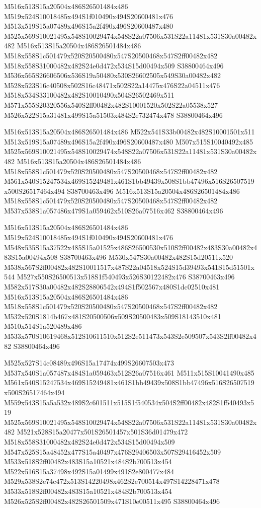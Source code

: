 \documentclass{article}
\begin{document}
\begin{multicols}{2}
M516x513S15a20504x486S26501484x486 M519x524S10018485x494S1f010490x494S20600481x476 M513x519S15a07489x496S15a2f490x496S20600487x480 M525x569S10021495x548S10029474x548S22a07506x531S22a11481x531S30a00482x482 M516x513S15a20504x486S26501484x486 M518x558S1c501479x520S20500480x547S20500468x547S2ff00482x482 M518x558S31000482x482S24e0d472x534S15d00494x509 S38800464x496 M536x565S26606506x536S19a50480x530S26602505x549S30a00482x482 M528x523S16c40508x502S16c48471x502S22a14475x476S22a04511x476 M518x534S33100482x482S10010490x504S26502469x511 M571x555S20320556x540S2ff00482x482S10001520x502S22a05538x527 M526x522S15a31481x499S15a51503x484S2e732474x478 S38800464x496

M516x513S15a20504x486S26501484x486 M522x541S33b00482x482S10001501x511 M513x519S15a07489x496S15a2f490x496S20600487x480 M507x515S10040492x485 M525x569S10021495x548S10029474x548S22a07506x531S22a11481x531S30a00482x482 M516x513S15a20504x486S26501484x486 M518x558S1c501479x520S20500480x547S20500468x547S2ff00482x482 M561x540S15247534x469S15249481x461S1bb49439x508S1bb47496x516S26507519x500S26517464x494 S38700463x496 M516x513S15a20504x486S26501484x486 M518x558S1c501479x520S20500480x547S20500468x547S2ff00482x482 M537x538S1a057486x479S1a059462x510S26a07516x462 S38800464x496

M516x513S15a20504x486S26501484x486 M519x524S10018485x494S1f010490x494S20600481x476 M548x535S15a37522x485S15a01525x486S26500530x510S2ff00482x483S30a00482x483S15a00494x508 S38700463x496 M530x547S30a00482x482S15d20511x520 M538x567S2ff00482x482S10011517x487S22a04518x524S15d39493x541S15d51501x544 M527x550S26500513x518S1f540493x526S30122482x476 S38700463x496 M582x517S30a00482x482S28806542x494S1f502567x480S1dc02510x481 M516x513S15a20504x486S26501484x486 M518x558S1c501479x520S20500480x547S20500468x547S2ff00482x482 M532x520S1814b467x481S20500506x509S20500483x509S18143510x481 M510x514S1a520489x486 M533x570S10619468x512S10611510x512S2e511473x543S2e509507x543S2ff00482x482 S38800464x496

M525x527S14c08489x496S15a17474x499S26607503x473 M537x540S1a057487x484S1a059463x512S26a07516x461 M511x515S10041490x485 M561x540S15247534x469S15249481x461S1bb49439x508S1bb47496x516S26507519x500S26517464x494 M559x543S15a5a532x489S2c601511x515S1f540534x504S2ff00482x482S1f540493x519 M525x569S10021495x548S10029474x548S22a07506x531S22a11481x531S30a00482x482 M521x528S15a20477x501S26501457x501S36d01479x472 M518x558S31000482x482S24e0d472x534S15d00494x509 M547x525S15a48452x477S15a40497x476S29406503x507S29416452x509 M533x518S2ff00482x483S15a10521x484S2b700513x454 M522x516S15a37498x492S15a01499x491S2e800477x484 M529x538S2e74c472x513S14220498x462S2e700514x497S14228471x478 M533x518S2ff00482x483S15a10521x484S2b700513x454 M526x525S2ff00482x482S26501509x471S10e00511x495 S38800464x496


\end{multicols}
\end{document}

